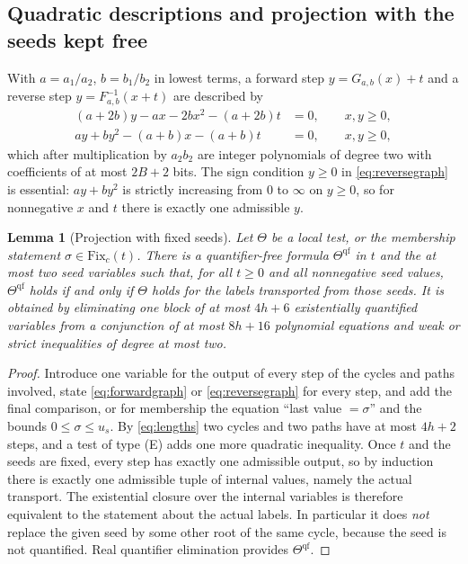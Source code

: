 \documentclass[11pt,a4paper]{article}
\theoremstyle{plain}
\newtheorem{lemma}[theorem]{Lemma}
\theoremstyle{definition}
\theoremstyle{remark}
\begin{document}
\subsection{Quadratic descriptions and projection with the seeds kept free}
With $a=a_1/a_2$, $b=b_1/b_2$ in lowest terms, a forward step $y=G_{a,b}(x)+t$ and a reverse step $y=F_{a,b}^{-1}(x+t)$ are described by
\begin{align}
 (a+2b)y-ax-2bx^2-(a+2b)t&=0,\qquad x,y\ge0,\label{eq:forwardgraph}\\
 ay+by^2-(a+b)x-(a+b)t&=0,\qquad x,y\ge0,\label{eq:reversegraph}
\end{align}
which after multiplication by $a_2b_2$ are integer polynomials of degree two with coefficients of at most $2B+2$ bits. The sign condition $y\ge0$ in \eqref{eq:reversegraph} is essential: $ay+by^2$ is strictly increasing from $0$ to $\infty$ on $y\ge0$, so for nonnegative $x$ and $t$ there is exactly one admissible $y$.

\begin{lemma}[Projection with fixed seeds]\label{lem:projection}
Let $\Theta$ be a local test, or the membership statement $\sigma\in\mathrm{Fix}_c(t)$. There is a quantifier-free formula $\Theta^{\mathrm{qf}}$ in $t$ and the at most two seed variables such that, for all $t\ge0$ and all nonnegative seed values, $\Theta^{\mathrm{qf}}$ holds if and only if $\Theta$ holds for the labels transported from \emph{those} seeds. It is obtained by eliminating one block of at most $4h+6$ existentially quantified variables from a conjunction of at most $8h+16$ polynomial equations and weak or strict inequalities of degree at most two.
\end{lemma}
\begin{proof}
Introduce one variable for the output of every step of the cycles and paths involved, state \eqref{eq:forwardgraph} or \eqref{eq:reversegraph} for every step, and add the final comparison, or for membership the equation ``last value $=\sigma$'' and the bounds $0\le\sigma\le u_s$. By \eqref{eq:lengths} two cycles and two paths have at most $4h+2$ steps, and a test of type (E) adds one more quadratic inequality. Once $t$ and the seeds are fixed, every step has exactly one admissible output, so by induction there is exactly one admissible tuple of internal values, namely the actual transport. The existential closure over the internal variables is therefore equivalent to the statement about the actual labels. In particular it does \emph{not} replace the given seed by some other root of the same cycle, because the seed is not quantified. Real quantifier elimination \citep{tarski1951,bpr2006} provides $\Theta^{\mathrm{qf}}$.
\end{proof}
\end{document}
